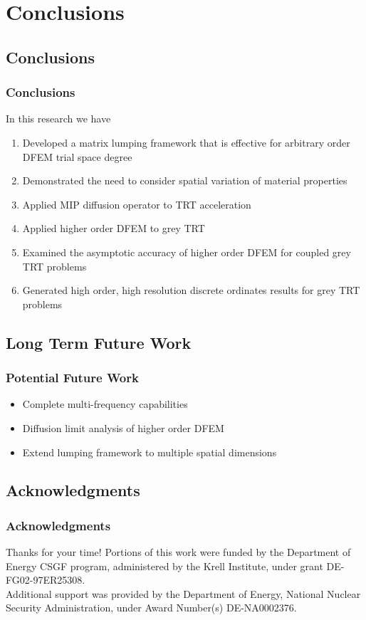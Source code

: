 \documentclass{beamer}
\begin{document}
\section{Conclusions}
\subsection{Conclusions}
\begin{frame}
\frametitle{Conclusions}
In this research we have
\begin{enumerate}
\item Developed a matrix lumping framework that is effective for arbitrary order DFEM trial space degree
\item Demonstrated the need to consider spatial variation of material properties
\item Applied MIP diffusion operator to TRT acceleration
\item Applied higher order DFEM to grey TRT
\item Examined the asymptotic accuracy of higher order DFEM for coupled grey TRT problems
\item Generated high order, high resolution discrete ordinates results for grey TRT problems 
\end{enumerate}
\end{frame}

\subsection{Long Term Future Work}
\begin{frame}
\frametitle{Potential Future Work}
\begin{itemize}
\item Complete multi-frequency capabilities
\item Diffusion limit analysis of higher order DFEM
\item Extend lumping framework to multiple spatial dimensions
\end{itemize}
\end{frame}

\subsection{Acknowledgments}
\begin{frame}
\frametitle{Acknowledgments}
Thanks for your time!
\vspace{0.3in}
Portions of this work were funded by the Department of Energy CSGF program, administered by the Krell Institute, under grant DE-FG02-97ER25308.
\\
\vspace{0.3in}
Additional support was provided by the Department of Energy, National Nuclear Security Administration, under Award Number(s) DE-NA0002376.

\end{frame}
\end{document}
